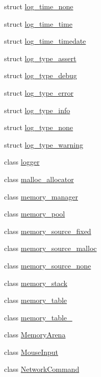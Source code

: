 \begin{DoxyCompactItemize}
struct \hyperlink{structcrap_1_1log__time__none}{log\+\_\+time\+\_\+none}
\item 
struct \hyperlink{structcrap_1_1log__time__time}{log\+\_\+time\+\_\+time}
\item 
struct \hyperlink{structcrap_1_1log__time__timedate}{log\+\_\+time\+\_\+timedate}
\item 
struct \hyperlink{structcrap_1_1log__type__assert}{log\+\_\+type\+\_\+assert}
\item 
struct \hyperlink{structcrap_1_1log__type__debug}{log\+\_\+type\+\_\+debug}
\item 
struct \hyperlink{structcrap_1_1log__type__error}{log\+\_\+type\+\_\+error}
\item 
struct \hyperlink{structcrap_1_1log__type__info}{log\+\_\+type\+\_\+info}
\item 
struct \hyperlink{structcrap_1_1log__type__none}{log\+\_\+type\+\_\+none}
\item 
struct \hyperlink{structcrap_1_1log__type__warning}{log\+\_\+type\+\_\+warning}
\item 
class \hyperlink{classcrap_1_1logger}{logger}
\item 
class \hyperlink{classcrap_1_1malloc__allocator}{malloc\+\_\+allocator}
\item 
class \hyperlink{classcrap_1_1memory__manager}{memory\+\_\+manager}
\item 
class \hyperlink{classcrap_1_1memory__pool}{memory\+\_\+pool}
\item 
class \hyperlink{classcrap_1_1memory__source__fixed}{memory\+\_\+source\+\_\+fixed}
\item 
class \hyperlink{classcrap_1_1memory__source__malloc}{memory\+\_\+source\+\_\+malloc}
\item 
class \hyperlink{classcrap_1_1memory__source__none}{memory\+\_\+source\+\_\+none}
\item 
class \hyperlink{classcrap_1_1memory__stack}{memory\+\_\+stack}
\item 
class \hyperlink{classcrap_1_1memory__table}{memory\+\_\+table}
\item 
class \hyperlink{classcrap_1_1memory__table__64}{memory\+\_\+table\+\_}
\item 
class \hyperlink{classcrap_1_1_memory_arena}{Memory\+Arena}
\item 
class \hyperlink{classcrap_1_1_mouse_input}{Mouse\+Input}
\item 
class \hyperlink{classcrap_1_1_network_command}{Network\+Command}
\item 

\end{DoxyCompactItemize}
